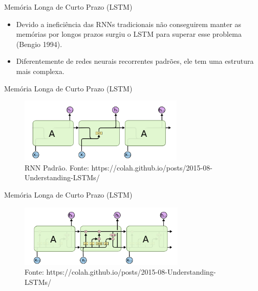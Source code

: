 \documentclass[
  ignorenonframetext,
]{beamer}
\providecommand{\tightlist}{%
  \setlength{\itemsep}{0pt}\setlength{\parskip}{0pt}}\usepackage{longtable,booktabs,array}
\begin{document}
\begin{frame}{Memória Longa de Curto Prazo (LSTM)}
\label{memuxf3ria-longa-de-curto-prazo-lstm-1}
\begin{itemize}
\tightlist
\item
  Devido a ineficiência das RNNs tradicionais não conseguirem manter as
  memórias por longos prazos surgiu o LSTM para superar esse problema
  (Bengio 1994).
\item
  Diferentemente de redes neurais recorrentes padrões, ele tem uma
  estrutura mais complexa.
\end{itemize}
\end{frame}

\begin{frame}{Memória Longa de Curto Prazo (LSTM)}
\label{memuxf3ria-longa-de-curto-prazo-lstm-2}
\begin{figure}[H]

{\centering \includegraphics[width=3.09in,height=\textheight]{RNN_padrao.png}

}

\caption{RNN Padrão. Fonte:
https://colah.github.io/posts/2015-08-Understanding-LSTMs/}

\end{figure}%
\end{frame}

\begin{frame}{Memória Longa de Curto Prazo (LSTM)}
\label{memuxf3ria-longa-de-curto-prazo-lstm-3}
\begin{figure}[H]

{\centering \includegraphics[width=3.11in,height=\textheight]{estrutura_lstm.png}

}

\caption{Fonte:
https://colah.github.io/posts/2015-08-Understanding-LSTMs/}

\end{figure}%
\end{frame}
\end{document}
